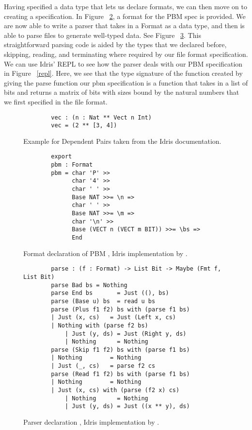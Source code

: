 Having specified a data type that lets us declare formats, we can then move on
to creating a specification. In Figure ~\ref{spec_declaration}, a format for the
PBM spec is provided. We are now able to write a parser that takes in a Format as a data type, and
then is able to parse files to generate well-typed data. See Figure
~\ref{parser}. This straightforward parsing code is aided by the types that we
declared before, skipping, reading, and terminating where required by our file
format specification. We can use Idris' REPL to see how the parser deals with
our PBM specification in Figure ~\ref{repl}. Here, we see that the type
signature of the function created by giving the parse function our pbm
specification is a function that takes in a list of bits and returns a matrix of
bits with sizes bound by the natural numbers that we first specified in the file
format. 

\begin{figure}
    \caption{Example for Dependent Pairs taken from the Idris documentation.}
    \label{dependentPairExample}
    \begin{lstlisting}
        vec : (n : Nat ** Vect n Int)
        vec = (2 ** [3, 4])
    \end{lstlisting}
\end{figure}

\begin{figure}
    \caption{Format declaration of PBM \cite{power_of_pi}, Idris implementation by \cite{idris_pop}.}
    \label{spec_declaration}
    \begin{lstlisting}
        export
        pbm : Format
        pbm = char 'P' >>
              char '4' >>
              char ' ' >>
              Base NAT >>= \n =>
              char ' ' >>
              Base NAT >>= \m =>
              char '\n' >>
              Base (VECT n (VECT m BIT)) >>= \bs =>
              End
    \end{lstlisting}
\end{figure}


\begin{figure}
    \caption{Parser declaration \cite{power_of_pi}, Idris implementation by \cite{idris_pop}.}
    \label{parser}
    \begin{lstlisting}
        parse : (f : Format) -> List Bit -> Maybe (Fmt f, List Bit)
        parse Bad bs = Nothing
        parse End bs       = Just ((), bs)
        parse (Base u) bs  = read u bs
        parse (Plus f1 f2) bs with (parse f1 bs)
        | Just (x, cs)   = Just (Left x, cs)
        | Nothing with (parse f2 bs)
            | Just (y, ds) = Just (Right y, ds)
            | Nothing      = Nothing
        parse (Skip f1 f2) bs with (parse f1 bs)
        | Nothing        = Nothing
        | Just (_, cs)   = parse f2 cs
        parse (Read f1 f2) bs with (parse f1 bs)
        | Nothing        = Nothing
        | Just (x, cs) with (parse (f2 x) cs)
            | Nothing      = Nothing
            | Just (y, ds) = Just ((x ** y), ds)
    \end{lstlisting}
\end{figure}

